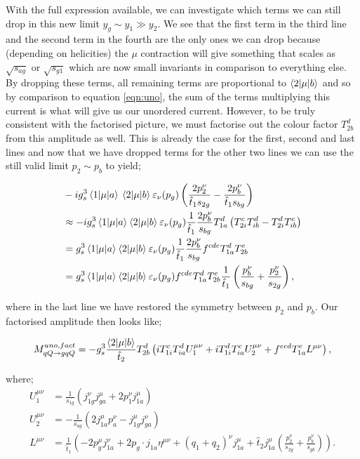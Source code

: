 With the full expression available, we can investigate which terms we can still drop in this new limit $y_g \sim y_1 \gg y_2$. We see that the first term in the third line and the second term in the fourth are the only ones we can drop because (depending on helicities) the $\mu$ contraction will give something that scales as $\sqrt{s_{ag}}$ or $\sqrt{s_{g1}}$ which are now small invariants in comparison to everything else. By dropping these terms, all remaining terms are proportional to $\mathinner{\langle2\vert\mu\vert b\rangle}_{}$ and so by comparison to equation \ref{eqn:uno}, the sum of the terms multiplying this current is what will give us our unordered current. However, to be truly consistent with the factorised picture, we must factorise out the colour factor $T^d_{2b}$ from this amplitude as well. This is already the case for the first, second and last lines and now that we have dropped terms for the other two lines we can use the still valid limit $p_2 \sim p_b$ to yield;

\begin{equation}
\begin{split}
& -ig_s^3 \mathinner{\langle1\vert\mu\vert a\rangle}_{}{} \mathinner{\langle2\vert\mu\vert b\rangle}_{} \varepsilon_\nu(p_g) \left(\frac{2p_2^\nu}{\hat{t}_1 s_{2g}} - \frac{2p_b^\nu}{\hat{t}_1s_{bg}} \right) \\
& \approx -i g_s^3 \mathinner{\langle1\vert\mu\vert a\rangle}_{} \mathinner{\langle2\vert\mu\vert b\rangle}_{} \varepsilon_\nu(p_g) \frac{1}{\hat{t}_1}\frac{2p_b^\nu}{s_{bg}} T^d_{1a}\left(T^c_{2i}T^d_{ib} - T^d_{2i}T^c_{ib}\right)  \\
&= g_s^3 \mathinner{\langle1\vert\mu\vert a\rangle}_{} \mathinner{\langle2\vert\mu\vert b\rangle}_{} \varepsilon_\nu(p_g) \frac{1}{\hat{t}_1} \frac{2 p_b^\nu}{s_{bg}} f^{cde}T^d_{1a}T^e_{2b} \\
&= g_s^3 \mathinner{\langle1\vert\mu\vert a\rangle}_{} \mathinner{\langle2\vert\mu\vert b\rangle}_{} \varepsilon_\nu(p_g) f^{cde}T^d_{1a}T^e_{2b} \frac{1}{\hat{t}_1} \left(\frac{p_b^\nu}{s_{bg}}+\frac{p_2^\nu}{s_{2g}} \right),
\end{split}
\end{equation}

where in the last line we have restored the symmetry between $p_2$ and $p_b$. Our factorised amplitude then looks like;

\begin{equation}
M_{qQ \to gqQ}^{uno, fact} = -g_s^3 \frac{\mathinner{\langle2\vert\mu\vert b\rangle}_{}}{\hat{t}_2}T_{2b}^d \left(iT^c_{1i}T^d_{ia}U_1^{\mu \nu} + iT^d_{1i}T^c_{ia}U_2^{\mu \nu} + f^{ecd}T^e_{1a}L^{\mu \nu} \right),
\end{equation}

where;
\begin{equation}
\begin{split}
U_1^{\mu \nu} &= \frac{1}{s_{1g}}(j^\nu_{1g}j^\mu_{ga} + 2 p_1^\nu j^\mu_{1a}) \\
U_2^{\mu \nu} &= -\frac{1}{s_{ag}}(2j^\mu_{1a}p_a^\nu - j^\mu_{1g}j^\nu_{ga}) \\
L^{\mu \nu} &= \frac{1}{\hat{t}_1} \left(-2p^\mu_g j^\nu_{1a} + 2 p_g \cdot j_{1a}\eta^{\mu \nu} + (q_1 + q_2)^\nu j^{\mu}_{1a} + \hat{t}_2 j^\mu_{1a} \left(\frac{p_2^\nu}{s_{2g}} + \frac{p_b^\nu}{s_{gb}} \right) \right).
\end{split}
\end{equation}

